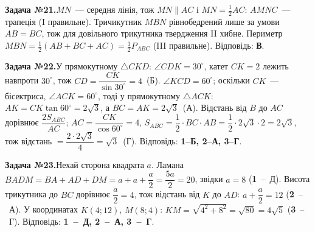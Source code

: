 \documentclass[12pt]{article}
\begin{document}
\par\vspace{0.3cm}\noindent\hypertarget{sol:21}{}
\begin{tcolorbox}[colback=titleBg!40, colframe=mainGreen!55, boxrule=0.4pt, arc=2pt, left=6pt, right=6pt, top=4pt, bottom=4pt, breakable]
\noindent\small\textbf{Задача №21.}\quad $MN$~--- середня лінія, тож $MN\parallel AC$ і $MN=\tfrac12 AC$: $AMNC$~--- трапеція (I правильне). Тричикутник $MBN$ рівнобедрений лише за умови $AB=BC$, тож для довільного трикутника твердження II хибне. Периметр $MBN=\tfrac12(AB+BC+AC)=\tfrac12 P_{ABC}$ (III правильне). Відповідь: \textbf{В}.
\par\vspace{0.1cm}\hfill\hyperlink{task:21}{}
\end{tcolorbox}
\par\vspace{0.3cm}\noindent\hypertarget{sol:22}{}
\begin{tcolorbox}[colback=titleBg!40, colframe=mainGreen!55, boxrule=0.4pt, arc=2pt, left=6pt, right=6pt, top=4pt, bottom=4pt, breakable]
\noindent\small\textbf{Задача №22.}\quad У прямокутному $\triangle CKD$: $\angle CDK=30^\circ$, катет $CK=2$ лежить навпроти $30^\circ$, тож $CD=\dfrac{CK}{\sin 30^\circ}=4$~(Б). $\angle KCD=60^\circ$; оскільки $CK$~--- бісектриса, $\angle ACK=60^\circ$, тоді у прямокутному $\triangle ACK$: $AK=CK\tan 60^\circ=2\sqrt{3}$, а $BC=AK=2\sqrt{3}$~(А). Відстань від $B$ до $AC$ дорівнює $\dfrac{2S_{ABC}}{AC}$; $AC=\dfrac{CK}{\cos 60^\circ}=4$, $S_{ABC}=\dfrac{1}{2}\cdot BC\cdot AB=\dfrac{1}{2}\cdot 2\sqrt{3}\cdot 2=2\sqrt{3}$, тож відстань $=\dfrac{2\cdot 2\sqrt{3}}{4}=\sqrt{3}$~(Г). Відповідь: \textbf{1--Б, 2--А, 3--Г}.
\par\vspace{0.1cm}\hfill\hyperlink{task:22}{}
\end{tcolorbox}
\par\vspace{0.3cm}\noindent\hypertarget{sol:23}{}
\begin{tcolorbox}[colback=titleBg!40, colframe=mainGreen!55, boxrule=0.4pt, arc=2pt, left=6pt, right=6pt, top=4pt, bottom=4pt, breakable]
\noindent\small\textbf{Задача №23.}\quad Нехай сторона квадрата $a$. Ламана $BADM=BA+AD+DM=a+a+\dfrac a2=\dfrac{5a}{2}=20$, звідки $a=8$ (\textbf{1}~--~Д). Висота трикутника до $BC$ дорівнює $\dfrac a2=4$, тож відстань від $K$ до $AD$: $a+\dfrac a2=12$ (\textbf{2}~--~А). У координатах $K(4;12)$, $M(8;4)$: $KM=\sqrt{4^2+8^2}=\sqrt{80}=4\sqrt5$ (\textbf{3}~--~Г). Відповідь: \textbf{1~--~Д, 2~--~А, 3~--~Г}.
\par\vspace{0.1cm}\hfill\hyperlink{task:23}{}
\end{tcolorbox}
\end{document}
